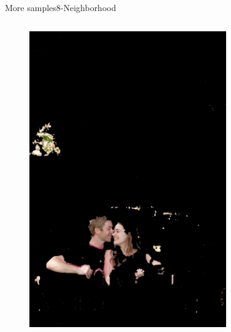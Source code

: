 \documentclass{beamer}
\begin{document}
\begin{frame}{More samples}{8-Neighborhood}
\begin{columns}
\begin{column}{3cm}
	\begin{figure}
		\includegraphics[width=0.9\textwidth]{label1000} 
		\end{figure}
\end{column}
\begin{column}{3cm}
	\begin{figure}

\end{figure}
\end{column}
\end{columns}
\end{frame}
\end{document}
